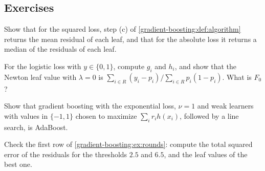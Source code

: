 \begin{notechapter}
\section*{Exercises}

\begin{exercise}\label{gradient-boosting:exr:1}
Show that for the squared loss, step (c) of \cref{gradient-boosting:def:algorithm} returns the
mean residual of each leaf, and that for the absolute loss it returns a median of the
residuals of each leaf.
\end{exercise}

\begin{exercise}\label{gradient-boosting:exr:2}
For the logistic loss with $y\in\{0, 1\}$, compute $g_i$ and $h_i$, and show that the Newton leaf value
with $\lambda = 0$ is $\sum_{i\in R}(y_i - p_i)/\sum_{i\in R}p_i(1 - p_i)$. What is $F_0$?
\end{exercise}

\begin{exercise}\label{gradient-boosting:exr:3}
Show that gradient boosting with the exponential loss, $\nu = 1$ and weak learners with values in
$\{-1, 1\}$ chosen to maximize $\sum_ir_ih(x_i)$, followed by a line search, is AdaBoost.
\end{exercise}

\begin{exercise}\label{gradient-boosting:exr:4}
Check the first row of \cref{gradient-boosting:ex:rounds}: compute the total squared error of the
residuals for the thresholds $2.5$ and $6.5$, and the leaf values of the best one.
\end{exercise}
\end{notechapter}
